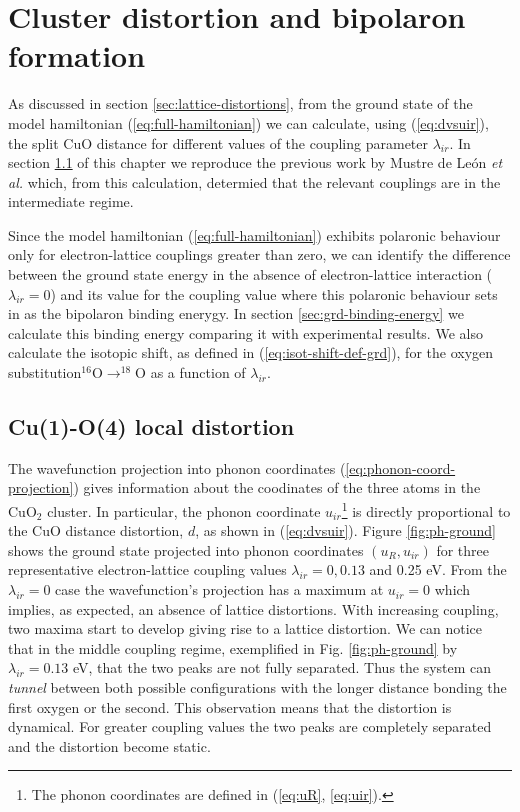 \chapter{Cluster distortion and bipolaron formation}
\label{chap:ground}

As discussed in section \ref{sec:lattice-distortions}, from the ground state of the model hamiltonian (\ref{eq:full-hamiltonian}) we can calculate, using (\ref{eq:dvsuir}), the split CuO distance for different values of the coupling parameter $\lambda_{ir}$.
In section \ref{sec:grd-phonon-proj} of this chapter we reproduce the previous work by Mustre de Le\'{o}n \textit{et al.} \cite{MustredeLeon1992} which, from this calculation, determied that the relevant couplings are in the intermediate regime.

Since the model hamiltonian (\ref{eq:full-hamiltonian}) exhibits polaronic behaviour only for electron-lattice couplings greater than zero, we can identify the difference between the ground state energy in the absence of electron-lattice interaction ($\lambda_{ir}=0$) and its value for the coupling value where this polaronic behaviour sets in as the bipolaron binding enerygy.
In section \ref{sec:grd-binding-energy} we calculate this binding energy comparing it with experimental results.
We also calculate the isotopic shift, as defined in (\ref{eq:isot-shift-def-grd}), for the oxygen substitution$^{16}$O$\rightarrow ^{18}$O as a function of $\lambda_{ir}$.

\section{Cu(1)-O(4) local distortion}
\label{sec:grd-phonon-proj}

The wavefunction projection into phonon coordinates (\ref{eq:phonon-coord-projection}) gives information about the coodinates of the three atoms in the CuO$_2$ cluster.
In particular, the phonon coordinate $u_{ir}$\footnote{The phonon coordinates are  defined in (\ref{eq:uR}, \ref{eq:uir}).} is directly proportional to the CuO distance distortion, $d$, as shown in (\ref{eq:dvsuir}).
Figure \ref{fig:ph-ground} shows the ground state projected into phonon coordinates $(u_R,u_{ir})$ for three representative electron-lattice coupling values $\lambda_{ir}=0, 0.13$ and 0.25 eV.
From the $\lambda_{ir}=0$ case the wavefunction's projection has a maximum at $u_{ir}=0$ which implies, as expected, an absence of lattice distortions.
With increasing coupling, two maxima start to develop giving rise to a lattice distortion.
We can notice that in the middle coupling regime, exemplified in Fig. \ref{fig:ph-ground} by $\lambda_{ir}=0.13$ eV, that the two peaks are not fully separated.
Thus the system can \textit{tunnel} between both possible configurations with the longer distance bonding the first oxygen or the second.
This observation means that the distortion is dynamical. 
For greater coupling values the two peaks are completely separated and the distortion become static.

